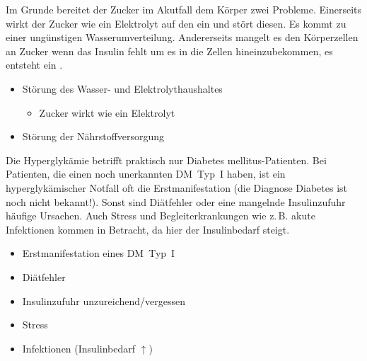 {
Im Grunde bereitet der Zucker im Akutfall dem Körper zwei
Probleme. Einerseits wirkt der Zucker wie ein Elektrolyt auf
den  ein und stört diesen. Es kommt
zu einer ungünstigen Wasserumverteilung. Andererseits
mangelt es den Körperzellen an Zucker wenn das Insulin fehlt
um es in die Zellen hineinzubekommen, es entsteht ein
.
}{
\begin{itemize}
  \item Störung des Wasser- und Elektrolythaushaltes
  \begin{itemize}
    \item Zucker wirkt wie ein Elektrolyt
  \end{itemize}
  \item Störung der Nährstoffversorgung
\end{itemize}
}{}{}{}

{%
Die Hyperglykämie betrifft praktisch nur Diabetes mellitus-Patienten. Bei
Patienten, die einen noch unerkannten DM~Typ~I haben, ist
ein hyperglykämischer Notfall oft die Erstmanifestation (die
Diagnose Diabetes ist noch nicht bekannt!). Sonst sind
Diätfehler oder eine mangelnde Insulinzufuhr häufige
Ursachen. Auch Stress und Begleiterkrankungen wie z.\,B.
akute Infektionen kommen in Betracht, da hier der
Insulinbedarf steigt.
}{
\begin{itemize}
  \item Erstmanifestation eines DM~Typ~I
  \item Diätfehler
  \item Insulinzufuhr unzureichend/vergessen
  \item Stress
  \item Infektionen (Insulinbedarf ${\uparrow}$)
\end{itemize}
}{}{}{}










